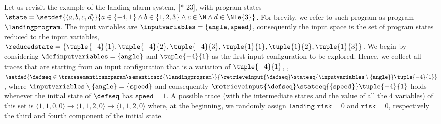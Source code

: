 \begin{example}
  \newcommand*{\inputa}{\tuple{-4}{1}} \newcommand*{\outputa}{\langle \outputvaluea\rangle} \newcommand*{\outputvaluea}{3}
  \newcommand*{\inputb}{\tuple{-4}{2}} \newcommand*{\outputb}{\langle \outputvalueb\rangle} \newcommand*{\outputvalueb}{3}
  \newcommand*{\inputc}{\tuple{-4}{3}} \newcommand*{\outputc}{\langle \outputvaluec\rangle} \newcommand*{\outputvaluec}{3}
  \newcommand*{\inputd}{\tuple{ 1}{1}} \newcommand*{\outputd}{\langle \outputvalued\rangle} \newcommand*{\outputvalued}{0}
  \newcommand*{\inpute}{\tuple{ 1}{2}} \newcommand*{\outpute}{\langle \outputvaluee\rangle} \newcommand*{\outputvaluee}{1}
  \newcommand*{\inputf}{\tuple{ 1}{3}} \newcommand*{\outputf}{\langle \outputvaluef\rangle} \newcommand*{\outputvaluef}{2}
  \newcommand*{\tracea}{\inputa\to\outputa}
  \newcommand*{\traceb}{\inputb\to\outputb}
  \newcommand*{\tracec}{\inputc\to\outputc}
  \newcommand*{\traced}{\inputd\to\outputd}
  \newcommand*{\tracee}{\inpute\to\outpute}
  \newcommand*{\tracef}{\inputf\to\outputf}
  Let us revisit the example of the landing alarm system, \cf{} [*-23], with program states $\state=\setdef{\langle a, b, c, d \rangle}{a\in\{-4,1\}\land b\in\{1,2,3\}\land c\in\N \land d\in\Nle{3}}$.
  For brevity, we refer to such program as program $\landingprogram$.
  The input variables are $\inputvariables = \{\texttt{angle},\texttt{speed}\}$, consequently the input space is the set of program states reduced to the input variables, \ie{}
  $\reducedstate=\{\inputa, \inputb, \inputc, \inputd, \inpute, \inputf\}$.
%
  We begin by considering $\definputvariables=\{\texttt{angle}\}$ and $\inputa$ as the first input configuration to be explored.
  Hence, we collect all traces that are
  starting from an input configuration that is a variation of $\inputa$, \ie, $\setdef{
    \defseq \in \tracesemanticsnoparam\semanticsof{\landingprogram}
  }{
    \retrieveinput{\defseq} \stateeq{\inputvariables\setminus\{\texttt{angle}\}} \inputa
  }$, where $\inputvariables\setminus\{\texttt{angle}\} = \{\texttt{speed}\}$ and consequently $\retrieveinput{\defseq} \stateeq{\{\texttt{speed}\}} \inputa$ holds whenever the initial state of $\defseq$ has $\texttt{speed}=1$. A possible trace (with the intermediate states and the value of all the 4 variables) of this set is $\langle 1, 1, 0, 0\rangle \to \langle 1, 1, 2, 0\rangle\to\langle 1, 1, 2, 0\rangle$ where, at the beginning, we randomly assign $\texttt{landing\_risk}=0$ and $\texttt{risk}=0$, respectively the third and fourth component of the initial state.

\end{example}
